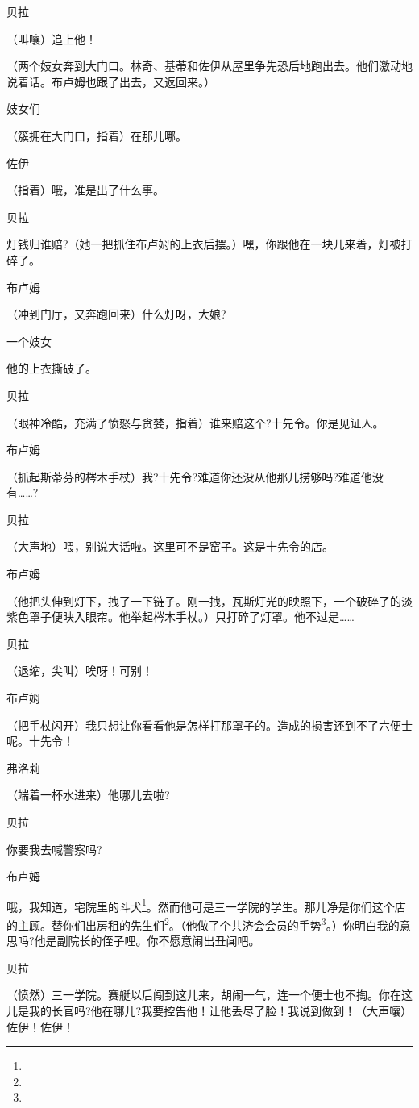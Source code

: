 \par 贝拉
\par （叫嚷）追上他！
\par （两个妓女奔到大门口。林奇、基蒂和佐伊从屋里争先恐后地跑出去。他们激动地说着话。布卢姆也跟了出去，又返回来。）
\par 妓女们
\par （簇拥在大门口，指着）在那儿哪。
\par 佐伊
\par （指着）哦，准是出了什么事。
\par 贝拉
\par 灯钱归谁赔?（她一把抓住布卢姆的上衣后摆。）嘿，你跟他在一块儿来着，灯被打碎了。
\par 布卢姆
\par （冲到门厅，又奔跑回来）什么灯呀，大娘?
\par 一个妓女
\par 他的上衣撕破了。
\par 贝拉
\par （眼神冷酷，充满了愤怒与贪婪，指着）谁来赔这个?十先令。你是见证人。
\par 布卢姆
\par （抓起斯蒂芬的梣木手杖）我?十先令?难道你还没从他那儿捞够吗?难道他没有……?
\par 贝拉
\par （大声地）喂，别说大话啦。这里可不是窑子。这是十先令的店。
\par 布卢姆
\par （他把头伸到灯下，拽了一下链子。刚一拽，瓦斯灯光的映照下，一个破碎了的淡紫色罩子便映入眼帘。他举起梣木手杖。）只打碎了灯罩。他不过是……
\par 贝拉
\par （退缩，尖叫）唉呀！可别！
\par 布卢姆
\par （把手杖闪开）我只想让你看看他是怎样打那罩子的。造成的损害还到不了六便士呢。十先令！
\par 弗洛莉
\par （端着一杯水进来）他哪儿去啦?
\par 贝拉
\par 你要我去喊警察吗?
\par 布卢姆
\par 哦，我知道，宅院里的斗犬\footnote{}。然而他可是三一学院的学生。那儿净是你们这个店的主顾。替你们出房租的先生们\footnote{}。（他做了个共济会会员的手势\footnote{}。）你明白我的意思吗?他是副院长的侄子哩。你不愿意闹出丑闻吧。
\par 贝拉
\par （愤然）三一学院。赛艇以后闯到这儿来，胡闹一气，连一个便士也不掏。你在这儿是我的长官吗?他在哪儿?我要控告他！让他丢尽了脸！我说到做到！（大声嚷）佐伊！佐伊！
